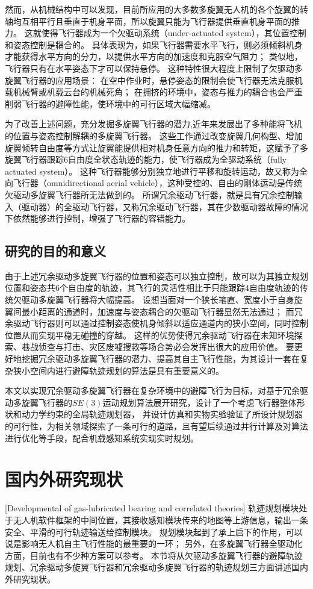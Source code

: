然而，从机械结构中可以发现，目前所应用的大多数多旋翼无人机的各个旋翼的转轴均互相平行且垂直于机身平面，所以旋翼只能为飞行器提供垂直机身平面的推力。
这就使得飞行器成为一个欠驱动系统（under-actuated system）\cite{underactuated}，其位置控制和姿态控制是耦合的。
具体表现为，如果飞行器需要水平飞行，则必须倾斜机身才能获得水平方向的分力，以提供水平方向的加速度和克服空气阻力；
类似地，飞行器只有在水平姿态下才可以保持悬停。
这种特性很大程度上限制了欠驱动多旋翼飞行器的应用场景：
在空中作业时，悬停姿态的限制会使飞行器无法克服机载机械臂或机载云台的机械死角；
在拥挤的环境中，姿态与推力的耦合也会严重削弱飞行器的避障性能，使环境中的可行区域大幅缩减。

为了改善上述问题，充分发掘多旋翼飞行器的潜力,近年来发展出了多种能将飞机的位置与姿态控制解耦的多旋翼飞行器。
这些工作通过改变旋翼几何构型、增加旋翼倾转自由度等方式让旋翼能提供相对机身任意方向的推力和转矩，这赋予了多旋翼飞行器跟踪6自由度全状态轨迹的能力，使飞行器成为全驱动系统（fully actuated system）。
这种飞行器能够分别独立地进行平移和旋转运动，故又称为全向飞行器（omnidirectional aerial vehicle），这种受控的、自由的刚体运动是传统欠驱动多旋翼飞行器所无法做到的。
所谓冗余驱动飞行器，就是具有冗余控制输入（驱动器）的全驱动飞行器，又称冗余驱动飞行器，其在少数驱动器故障的情况下依然能够进行控制，增强了飞行器的容错能力。


\subsection{研究的目的和意义}
由于上述冗余驱动多旋翼飞行器的位置和姿态可以独立控制，故可以为其独立规划位置和姿态共6个自由度的轨迹，其飞行的灵活性相比于只能跟踪4自由度轨迹的传统欠驱动多旋翼飞行器将大幅提高。
设想当面对一个狭长笔直、宽度小于自身旋翼间最小距离的通道时，加速度与姿态耦合的欠驱动飞行器显然无法通过；
而冗余驱动飞行器则可以通过控制姿态使机身倾斜以适应通道内的狭小空间，同时控制位置从而实现平稳无碰撞的穿越。
这样的优势使得冗余驱动飞行器在未知环境探索、巷战侦查与打击、灾区废墟搜救等场合势必会发挥出很大的应用价值。
要更好地挖掘冗余驱动多旋翼飞行器的潜力、提高其自主飞行性能，为其设计一套在复杂狭小空间内进行避障轨迹规划的算法是具有重要意义的。

本文以实现冗余驱动多旋翼飞行器在复杂环境中的避障飞行为目标，对基于冗余驱动多旋翼飞行器的$SE(3)$运动规划算法展开研究，设计了一个考虑飞行器整体形状和动力学约束的全局轨迹规划器，
并设计仿真和实物实验验证了所设计规划器的可行性，为相关领域探索了一条可行的道路，且有望后续通过并行计算及对算法进行优化等手段，配合机载感知系统实现实时规划。


\section{国内外研究现状}[Developmental of gas-lubricated bearing and correlated theories]
轨迹规划模块处于无人机软件框架的中间位置，其接收感知模块传来的地图等上游信息，输出一条安全、平滑的可行轨迹输送给控制模块。
规划模块起到了承上启下的作用，可以说是影响无人机自主飞行性能的最重要的一环；
另外，在多旋翼飞行器全驱动化方面，目前也有不少种方案可以参考。
本节将从欠驱动多旋翼飞行器的避障轨迹规划、冗余驱动多旋翼飞行器和冗余驱动多旋翼飞行器的轨迹规划三方面讲述国内外研究现状。

